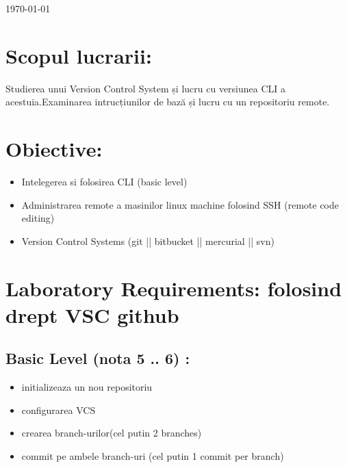 \documentclass[12pt]{article}
\begin{document}
\begin{titlepage}

{\large \today}\\[2cm] %


\vfill %

\end{titlepage}
\section{Scopul lucrarii:}
Studierea unui Version Control System și lucru cu versiunea CLI a acestuia.Examinarea intrucțiunilor de bază și lucru cu un repositoriu remote.
\section{Obiective:}
\begin{itemize}
\item Intelegerea si folosirea CLI (basic level)
\item Administrarea remote a masinilor linux machine folosind SSH (remote code editing)
\item Version Control Systems (git || bitbucket || mercurial || svn)
\end{itemize}
\section{Laboratory Requirements: folosind drept VSC github}
\label{sec:examples}

\subsection{Basic Level (nota 5 .. 6) :}
\begin{itemize}
\item initializeaza un nou repositoriu
\item configurarea VCS
\item crearea branch-urilor(cel putin 2 branches)
\item commit pe ambele branch-uri (cel putin 1 commit per branch)
\end{itemize}
\end{document}
